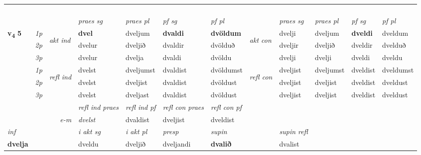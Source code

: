 \begin{longtable}[l]{X>{\footnotesize\itshape}llXXXXlXXXX}
\midrule
  & \\*
   & \\*
   & \\*
  & \\
   \midrule
 & &   & \textit{praes sg}  & \textit{praes pl}    & \textit{ pf sg} & \textit{pf pl} & & \textit{praes sg}  & \textit{praes pl}    & \textit{pf sg} & \textit{pf pl }  \\ \cmidrule{4-7} \cmidrule{9-12}
 \multirow{2}{*}{{{\textbf{v{\textsubscript{4}}} \Large{\textbf{5}}}}}  & 1p & \multirow{3}{*}{\begin{turn}{90}\textit{akt ind}\end{turn}} & \textbf{dvel} & dveljum & \textbf{dvaldi} & \textbf{dvöldum} & \multirow{3}{*}{\begin{turn}{90}\textit{akt con}\end{turn}} &dvelji & dveljum & \textbf{dveldi} & dveldum\\*
 & 2p &  &  dvelur  & dveljið & dvaldir & dvölduð & & dveljir & dveljið & dveldir & dvelduð \\*
 & 3p &  & dvelur & dvelja & dvaldi & dvöldu & & dvelji & dvelji& dveldi & dveldu \\*
\cmidrule{4-7} \cmidrule{9-12}
 & 1p & \multirow{3}{*}{\begin{turn}{90}\textit{refl ind}\end{turn}}  & dvelst & dveljumst & dvaldist & dvöldumst & \multirow{3}{*}{\begin{turn}{90}\textit{refl con}\end{turn}}  &dveljist & dveljumst & dveldist & dveldumst \\*
 & 2p &  & dvelst & dveljist & dvaldist & dvöldust & &dveljist & dveljist & dveldist & dveldust \\*
 & 3p  & & dvelst & dveljast & dvaldist & dvöldust & & dveljist & dveljist& dveldist & dveldust \\*
\cmidrule{4-7} \cmidrule{9-12}

 & && \textit{refl ind praes} & \textit{refl ind pf} & \textit{refl con praes} & \textit{refl con pf} \\*
\multicolumn{3}{r}{\textit{e-m}}& dvelst & dvaldist & dveljist & dveldist \\*

\cmidrule{4-7}
   {\textit{inf}} & &  & \textit{i akt sg} & \textit{i akt pl}   & \textit{presp} & \textit{supin} && \textit{supin refl}  \\*
  {\textbf{dvelja}} & && dveldu  & dveljið   & dveljandi &  \textbf{dvalið} && dvalist  \\*


\end{longtable}
